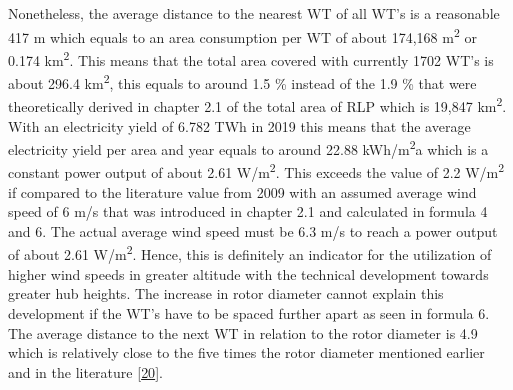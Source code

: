 \documentclass[a4paper,11pt]{article}
\begin{document}
Nonetheless, the average distance to the nearest WT of all WT's is a reasonable 417 m which equals to an area consumption per WT of about 174,168 m\textsuperscript{2} or 0.174 km\textsuperscript{2}. This means that the total area covered with currently 1702 WT's is about 296.4 km\textsuperscript{2}, this equals to around 1.5 \% instead of the 1.9 \% that were theoretically derived in chapter 2.1 of the total area of RLP which is 19,847 km\textsuperscript{2}. With an electricity yield of 6.782 TWh in 2019 this means that the average electricity yield per area and year equals to around 22.88 kWh/m\textsuperscript{2}a which is a constant power output of about 2.61 W/m\textsuperscript{2}. This exceeds the value of 2.2 W/m\textsuperscript{2} if compared to the literature value from 2009 with an assumed average wind speed of 6 m/s that was introduced in chapter 2.1 and calculated in formula 4 and 6. The actual average wind speed must be 6.3 m/s to reach a power output of about 2.61 W/m\textsuperscript{2}. Hence, this is definitely an indicator for the utilization of higher wind speeds in greater altitude with the technical development towards greater hub heights. The increase in rotor diameter cannot explain this development if the WT's have to be spaced further apart as seen in formula 6. The average distance to the next WT in relation to the rotor diameter is 4.9 which is relatively close to the five times the rotor diameter mentioned earlier and in the literature {[}\protect\hyperlink{ref-DavidJCMacKay.2009}{20}{]}.
\end{document}
